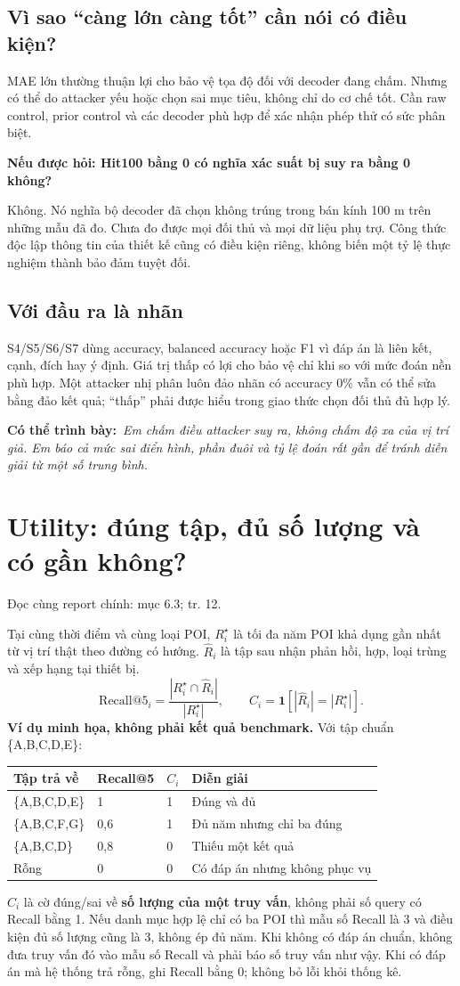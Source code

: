 \documentclass[10pt,a4paper]{article}
\newcommand{\say}[1]{\par\textbf{Có thể trình bày:}\ \textit{#1}\par}
\newcommand{\ask}[2]{\par\textbf{Nếu được hỏi: #1}\par #2\par}
\newcommand{\where}[1]{\par{\small\color{gray}Đọc cùng report chính: #1.}\par}
\newcommand{\example}{\textbf{Ví dụ minh họa, không phải kết quả benchmark.} }
\newcommand{\guidepage}[1]{\clearpage\section{#1}}
\begin{document}
\subsection*{Vì sao ``càng lớn càng tốt'' cần nói có điều kiện?}
MAE lớn thường thuận lợi cho bảo vệ tọa độ đối với decoder đang chấm. Nhưng có thể do attacker yếu hoặc chọn sai mục tiêu, không chỉ do cơ chế tốt. Cần raw control, prior control và các decoder phù hợp để xác nhận phép thử có sức phân biệt.

\ask{Hit100 bằng 0 có nghĩa xác suất bị suy ra bằng 0 không?}{Không. Nó nghĩa bộ decoder đã chọn không trúng trong bán kính 100 m trên những mẫu đã đo. Chưa đo được mọi đối thủ và mọi dữ liệu phụ trợ. Công thức độc lập thông tin của thiết kế cũng có điều kiện riêng, không biến một tỷ lệ thực nghiệm thành bảo đảm tuyệt đối.}

\subsection*{Với đầu ra là nhãn}
S4/S5/S6/S7 dùng accuracy, balanced accuracy hoặc F1 vì đáp án là liên kết, cạnh, đích hay ý định. Giá trị thấp có lợi cho bảo vệ chỉ khi so với mức đoán nền phù hợp. Một attacker nhị phân luôn đảo nhãn có accuracy 0\% vẫn có thể sửa bằng đảo kết quả; ``thấp'' phải được hiểu trong giao thức chọn đối thủ đủ hợp lý.
\say{Em chấm điều attacker suy ra, không chấm độ xa của vị trí giả. Em báo cả mức sai điển hình, phần đuôi và tỷ lệ đoán rất gần để tránh diễn giải từ một số trung bình.}

\guidepage{Utility: đúng tập, đủ số lượng và có gần không?}
\where{mục 6.3; tr. 12}
Tại cùng thời điểm và cùng loại POI, $R_i^\star$ là tối đa năm POI khả dụng gần nhất từ vị trí thật theo đường có hướng. $\widehat R_i$ là tập sau nhận phản hồi, hợp, loại trùng và xếp hạng tại thiết bị.
\[
\mathrm{Recall@5}_i=\frac{|R_i^\star\cap\widehat R_i|}{|R_i^\star|},\qquad
C_i=\mathbf1[|\widehat R_i|=|R_i^\star|].
\]
\example Với tập chuẩn \{A,B,C,D,E\}:
\begin{longtable}{@{}P{6.1cm}P{3.0cm}P{2.2cm}P{4.7cm}@{}}
\toprule Tập trả về & Recall@5 & $C_i$ & Diễn giải\\\midrule
\{A,B,C,D,E\} & 1 & 1 & Đúng và đủ\\[3pt]
\{A,B,C,F,G\} & 0,6 & 1 & Đủ năm nhưng chỉ ba đúng\\[3pt]
\{A,B,C,D\} & 0,8 & 0 & Thiếu một kết quả\\[3pt]
Rỗng & 0 & 0 & Có đáp án nhưng không phục vụ\\
\bottomrule
\end{longtable}
$C_i$ là cờ đúng/sai về \textbf{số lượng của một truy vấn}, không phải số query có Recall bằng 1. Nếu danh mục hợp lệ chỉ có ba POI thì mẫu số Recall là 3 và điều kiện đủ số lượng cũng là 3, không ép đủ năm.
Khi không có đáp án chuẩn, không đưa truy vấn đó vào mẫu số Recall và phải báo số truy vấn như vậy. Khi có đáp án mà hệ thống trả rỗng, ghi Recall bằng 0; không bỏ lỗi khỏi thống kê.
\end{document}
